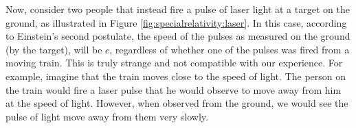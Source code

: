 Now, consider two people that instead fire a pulse of laser light at a target on the ground, as illustrated in Figure \ref{fig:specialrelativity:laser}. 
In this case, according to Einstein's second postulate, the speed of the pulses as measured on the ground (by the target), will be $c$, regardless of whether one of the pulses was fired from a moving train. This is truly strange and not compatible with our experience. For example, imagine that the train moves close to the speed of light. The person on the train would fire a laser pulse that he would observe to move away from him at the speed of light. However, when observed from the ground, we would see the pulse of light move away from them very slowly.

